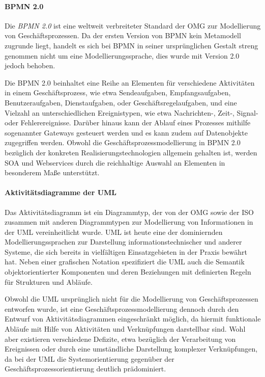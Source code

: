 \paragraph{\acl{BPMN} 2.0}
Die \textit{\acf{BPMN} 2.0} ist eine weltweit verbreiteter Standard der \ac{OMG} zur Modellierung von Geschäftsprozessen.
Da der ersten Version von \ac{BPMN} kein Metamodell zugrunde liegt, handelt es sich bei \ac{BPMN} in seiner ursprünglichen Gestalt streng genommen nicht um eine Modellierungssprache, dies wurde  mit Version 2.0 jedoch behoben. 
\cite{OMG.2014}

Die \ac{BPMN} 2.0 beinhaltet eine Reihe an Elementen für verschiedene Aktivitäten in einem Geschäftsprozess, wie etwa Sendeaufgaben, Empfangsaufgaben, Benutzeraufgaben, Dienstaufgaben, oder Geschäftsregelaufgaben, und eine Vielzahl an unterschiedlichen Ereignistypen, wie etwa Nachrichten-, Zeit-, Signal- oder Fehlerereignisse. 
Darüber hinaus kann der Ablauf eines Prozesses mithilfe sogenannter Gateways gesteuert werden und es kann zudem auf Datenobjekte zugegriffen werden. 
\cite{Weidlich.2010}
Obwohl die Geschäftsprozessmodellierung in \ac{BPMN} 2.0 bezüglich der konkreten Realisierungstechnologien allgemein gehalten ist, werden \ac{SOA} und Webservices durch die reichhaltige Auswahl an Elementen in besonderem Maße unterstützt.
\cite{Jobst.2010}

\paragraph{Aktivitätsdiagramme der \acl{UML}}
Das Aktivitätsdiagramm ist ein Diagrammtyp, der von der \ac{OMG} sowie der \ac{ISO} zusammen mit anderen Diagrammtypen zur Modellierung von Informationen in der \acf{UML} vereinheitlicht wurde.
\cite{OMG.2014}\cite{ISO.2012}
\ac{UML} ist heute eine der dominiernden Modellierungssprachen zur Darstellung informationstechnischer und anderer Systeme, die sich bereits in vielfältigen Einsatzgebieten in der Praxis bewährt hat.
Neben einer grafischen Notation spezifiziert die \ac{UML} auch die Semantik objektorientierter Komponenten und deren Beziehungen mit definierten Regeln für Strukturen und Abläufe.
\cite{Rumpe.2011}

Obwohl die \ac{UML} ursprünglich nicht für die Modellierung von Geschäftsprozessen entworfen wurde, ist eine Geschäftsprozessmodellierung dennoch durch den Entwurf von Aktivitätsdiagrammen eingeschränkt möglich, da hiermit funktionale Abläufe mit Hilfe von Aktivitäten und Verknüpfungen darstellbar sind. 
\cite{vanRanden.2016}
Wohl aber existieren verschiedene Defizite, etwa bezüglich der Verarbeitung von Ereignissen oder durch eine umständliche Darstellung komplexer Verknüpfungen, da bei der \ac{UML} die Systemorientierung gegenüber der Geschäftsprozessorientierung deutlich prädominiert.
\cite{Staud.2006}

